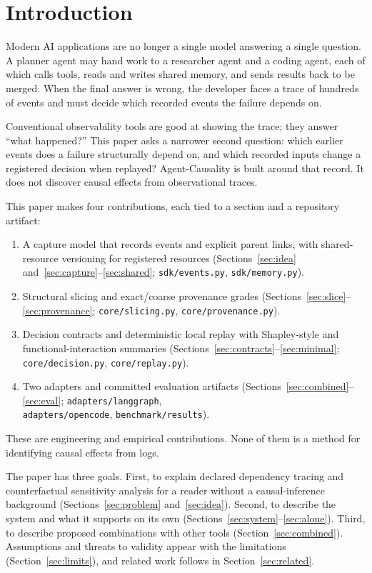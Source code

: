 \documentclass[11pt]{article}
\newcommand{\code}[1]{\textcolor{codegreen}{\texttt{#1}}}
\begin{document}
\section{Introduction}
Modern AI applications are no longer a single model answering a single question. A planner agent may hand work to a researcher agent and a coding agent, each of which calls tools, reads and writes shared memory, and sends results back to be merged. When the final answer is wrong, the developer faces a trace of hundreds of events and must decide which recorded events the failure depends on.

Conventional observability tools are good at showing the trace; they answer ``what happened?'' This paper asks a narrower second question: which earlier events does a failure structurally depend on, and which recorded inputs change a registered decision when replayed? Agent-Causality is built around that record. It does not discover causal effects from observational traces.

\vspace{1em}  

This paper makes four contributions, each tied to a section and a repository artifact:
\begin{enumerate}
\item A capture model that records events and explicit parent links, with shared-resource versioning for registered resources (Sections~\ref{sec:idea} and~\ref{sec:capture}--\ref{sec:shared}; \code{sdk/events.py}, \code{sdk/memory.py}).
\item Structural slicing and exact/coarse provenance grades (Sections~\ref{sec:slice}--\ref{sec:provenance}; \code{core/slicing.py}, \code{core/provenance.py}).
\item Decision contracts and deterministic local replay with Shapley-style and functional-interaction summaries (Sections~\ref{sec:contracts}--\ref{sec:minimal}; \code{core/decision.py}, \code{core/replay.py}).
\item Two adapters and committed evaluation artifacts (Sections~\ref{sec:combined}--\ref{sec:eval}; \code{adapters/langgraph}, \\ \code{adapters/opencode}, \code{benchmark/results}).
\end{enumerate}
These are engineering and empirical contributions. None of them is a method for identifying causal effects from logs. 

The paper has three goals. First, to explain declared dependency tracing and counterfactual sensitivity analysis for a reader without a causal-inference background (Sections~\ref{sec:problem} and~\ref{sec:idea}). Second, to describe the system and what it supports on its own (Sections~\ref{sec:system}--\ref{sec:alone}). Third, to describe proposed combinations with other tools (Section~\ref{sec:combined}). Assumptions and threats to validity appear with the limitations (Section~\ref{sec:limits}), and related work follows in Section~\ref{sec:related}.
\end{document}
